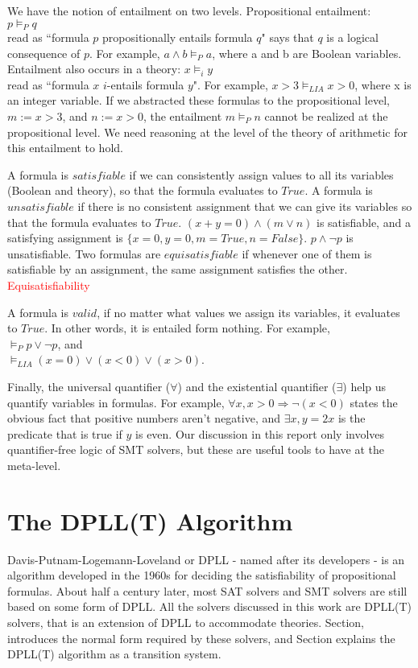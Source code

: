 \documentclass{article}
\begin{document}
We have the notion of entailment on two levels. Propositional 
entailment: \\
$p \models_P q$ \\
read as ``formula $p$ propositionally entails formula $q$" says 
that $q$ is a logical consequence of $p$. For example, 
$a \land b \models_P a$, where a and b are Boolean 
variables. Entailment also occurs in a theory:
$x \models_i y$ \\
read as ``formula $x$ $i$-entails formula $y$". For example, 
$x > 3 \models_{LIA} x > 0$, where x is an integer variable.
If we abstracted these formulas to the propositional level, 
$m := x > 3$, and $n := x > 0$, 
the entailment $m \models_P n$ cannot be realized at the 
propositional level. We need reasoning at the level of 
the theory of arithmetic for this entailment to hold.

A formula is $satisfiable$ if we can consistently assign
values to all its variables (Boolean and theory), 
so that the formula evaluates to $True$. A formula is 
$unsatisfiable$ if there is no consistent assignment that 
we can give its variables so that the formula evaluates to 
$True$. $(x + y = 0) \land (m \lor n)$ is satisfiable, 
and a satisfying assignment is $\{x = 0, y = 0, m = True, 
n = False\}$. $p \land \neg p$ is unsatisfiable. Two formulas 
are $equisatisfiable$ if whenever one of them is satisfiable 
by an assignment, the same assignment satisfies the other. 
\textcolor{red}{Equisatisfiability}

A formula is $valid$, if no matter what values we assign its 
variables, it evaluates to $True$. In other words, it is
entailed form nothing. For example, \\
$\models_P p \lor \neg p$, and \\
$\models_{LIA} (x = 0) \lor (x < 0) \lor (x > 0)$.

Finally, the universal quantifier ($\forall$) and 
the existential quantifier ($\exists$) help us quantify 
variables in formulas. For example, $\forall x, x > 0 
\Rightarrow \neg (x < 0)$ states the obvious fact that 
positive numbers aren't negative, and $\exists x, y = 2x$ 
is the predicate that is true if $y$ is even. Our discussion 
in this report only involves quantifier-free logic of SMT 
solvers, but these are useful tools to have at the meta-level.


\section{The DPLL(T) Algorithm}
\label{sec:dpll}
Davis-Putnam-Logemann-Loveland or DPLL - named after its 
developers - is an algorithm developed in the 1960s 
for deciding the satisfiability of propositional formulas.
About half a century later, most SAT solvers and SMT solvers
are still based on some form of DPLL. All the solvers 
discussed in this work are DPLL(T) solvers, that is an 
extension of DPLL to accommodate theories. Section,
introduces the normal form required by these solvers, 
and Section explains the DPLL(T) algorithm as a 
transition system.
\end{document}
